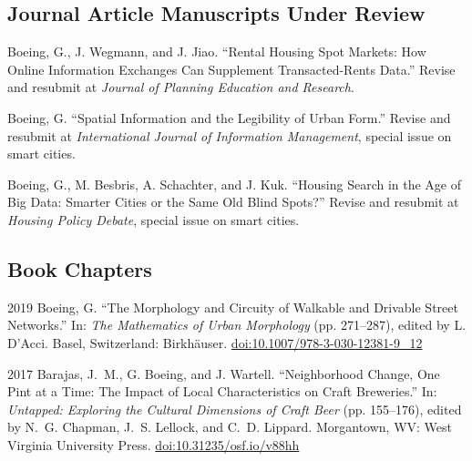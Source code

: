 \documentclass[12pt,letterpaper]{report}
\begin{document}
    \subsection*{Journal Article Manuscripts Under Review}

    \begin{tablist}

        \item[\the\year] \tab Boeing, G., J. Wegmann, and J. Jiao. \enquote{Rental Housing Spot Markets: How Online Information Exchanges Can Supplement Transacted-Rents Data.} Revise and resubmit at \textit{Journal of Planning Education and Research}.

        \item[\the\year] \tab Boeing, G. \enquote{Spatial Information and the Legibility of Urban Form.} Revise and resubmit at \textit{International Journal of Information Management}, special issue on smart cities.
        
        \item[\the\year] \tab Boeing, G., M. Besbris, A. Schachter, and J. Kuk. \enquote{Housing Search in the Age of Big Data: Smarter Cities or the Same Old Blind Spots?} Revise and resubmit at \textit{Housing Policy Debate}, special issue on smart cities.

    \end{tablist}



    \subsection*{Book Chapters}

    \begin{tablist}

        \item[2019] \tab Boeing, G. \enquote{The Morphology and Circuity of Walkable and Drivable Street Networks.} In: \textit{The Mathematics of Urban Morphology} (pp. 271--287), edited by L. D'Acci. Basel, Switzerland: Birkhäuser. \href{https://doi.org/10.1007/978-3-030-12381-9_12}{doi:10.1007/978-3-030-12381-9\_12}

        \item[2017] \tab Barajas, J.~M., G. Boeing, and J. Wartell. \enquote{Neighborhood Change, One Pint at a Time: The Impact of Local Characteristics on Craft Breweries.} In: \textit{Untapped: Exploring the Cultural Dimensions of Craft Beer} (pp. 155--176), edited by N.~G. Chapman, J.~S. Lellock, and C.~D. Lippard. Morgantown, WV: West Virginia University Press. \href{https://doi.org/10.31235/osf.io/v88hh}{doi:10.31235/osf.io/v88hh}

    \end{tablist}
\end{document}
